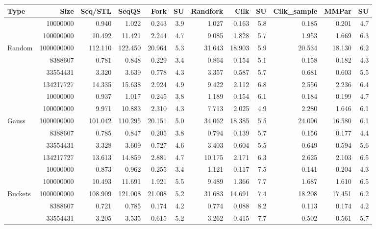 \documentclass[preprint]{sigplanconf}
\begin{document}
\begin{table*}[t!]
\begin{center}
\begin{tabular}{|lr|rr|rrr|rrr||rr|}
\hline
Type & Size & Seq/STL & SeqQS & Fork & SU & Randfork & Cilk & SU & Cilk\_sample & MMPar & SU \\
\hline
 & 10000000 & 0.940 & 1.022 & 0.243 & 3.9 & 1.027 & 0.163 & 5.8 & 0.185 & 0.201 & 4.7 \\
 & 100000000 & 10.492 & 11.421 & 2.244 & 4.7 & 9.085 & 1.828 & 5.7 & 1.953 & 1.669 & 6.3 \\
Random & 1000000000 & 112.110 & 122.450 & 20.964 & 5.3 & 31.643 & 18.903 & 5.9 & 20.534 & 18.130 & 6.2 \\
 & 8388607 & 0.781 & 0.848 & 0.229 & 3.4 & 0.864 & 0.154 & 5.1 & 0.158 & 0.182 & 4.3 \\
 & 33554431 & 3.320 & 3.639 & 0.778 & 4.3 & 3.357 & 0.587 & 5.7 & 0.681 & 0.603 & 5.5 \\
 & 134217727 & 14.335 & 15.638 & 2.924 & 4.9 & 9.422 & 2.112 & 6.8 & 2.556 & 2.236 & 6.4 \\
\hline
 & 10000000 & 0.937 & 1.017 & 0.245 & 3.8 & 1.189 & 0.154 & 6.1 & 0.184 & 0.199 & 4.7 \\
 & 100000000 & 9.971 & 10.883 & 2.310 & 4.3 & 7.713 & 2.025 & 4.9 & 2.280 & 1.646 & 6.1 \\
Gauss & 1000000000 & 101.042 & 110.295 & 20.151 & 5.0 & 34.062 & 18.385 & 5.5 & 24.096 & 16.580 & 6.1 \\
 & 8388607 & 0.785 & 0.847 & 0.205 & 3.8 & 0.794 & 0.139 & 5.7 & 0.156 & 0.177 & 4.4 \\
 & 33554431 & 3.328 & 3.609 & 0.727 & 4.6 & 3.403 & 0.604 & 5.5 & 0.649 & 0.594 & 5.6 \\
 & 134217727 & 13.613 & 14.859 & 2.881 & 4.7 & 10.175 & 2.171 & 6.3 & 2.625 & 2.103 & 6.5 \\
\hline
 & 10000000 & 0.873 & 0.962 & 0.255 & 3.4 & 1.121 & 0.117 & 7.5 & 0.141 & 0.204 & 4.3 \\
 & 100000000 & 10.493 & 11.691 & 1.921 & 5.5 & 9.489 & 1.366 & 7.7 & 1.687 & 1.610 & 6.5 \\
Buckets & 1000000000 & 108.909 & 121.008 & 21.008 & 5.2 & 31.683 & 14.691 & 7.4 & 18.208 & 17.451 & 6.2 \\
 & 8388607 & 0.721 & 0.785 & 0.174 & 4.2 & 0.774 & 0.088 & 8.2 & 0.113 & 0.174 & 4.2 \\
 & 33554431 & 3.205 & 3.535 & 0.615 & 5.2 & 3.262 & 0.415 & 7.7 & 0.502 & 0.561 & 5.7 \\

\end{tabular}
\end{center}
\end{table*}
\end{document}
